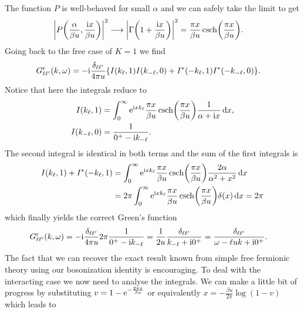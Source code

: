 \documentclass[english, parskip=full]{scrartcl}
\begin{document}
The function $P$ is well-behaved for small $\alpha$ and we can safely take the limit to get
\begin{align}
\abs*{P\kla*{\frac{\alpha}{\beta u}, \frac{\i x}{\beta u}}}^2 &\longrightarrow \abs*{\Gamma\kla*{1 + \frac{\i x}{\beta u}}}^2 = \frac{\pi x}{\beta u} \csch\kla*{\frac{\pi x}{\beta u}}.
\end{align}
Going back to the free case of $K=1$ we find
\begin{align}
G_{\ell\ell'}^\r(k,\omega) &= -\i\frac{\delta_{\ell\ell'}}{4\pi u} \klc*{I\kla*{k_\ell, 1} I(k_{-\ell}, 0) + I^\ast\kla*{-k_\ell, 1} I^\ast(-k_{-\ell}, 0)}.
\end{align}
Notice that here the integrals reduce to
\begin{align}
I(k_\ell, 1) &= \intx{0}{\infty}{\powe{ \i x k_\ell} \frac{\pi x}{\beta u} \csch\kla*{\frac{\pi x}{\beta u}} \frac{1}{\alpha + \i x} }{x},\\
I(k_{-\ell}, 0) &= \frac{1}{0^+ - \i k_{-\ell}}.
\end{align}
The second integral is identical in both terms and the sum of the first integrals is
\begin{align}
I(k_\ell, 1) + I^\ast(-k_\ell,1) &= \intx{0}{\infty}{\powe{\i xk_\ell} \frac{\pi x}{\beta u} \csch\kla*{\frac{\pi x}{\beta u}} \frac{2\alpha}{\alpha^2 + x^2}}{x} \\
&= 2\pi \intx{0}{\infty}{\powe{\i xk_\ell} \frac{\pi x}{\beta u} \csch\kla*{\frac{\pi x}{\beta u}} \delta(x)}{x} = 2\pi
\end{align}
which finally yields the correct Green's function
\begin{align}
G_{\ell\ell'}^{\text{r}} (k,\omega) &= -\text{i} \frac{\delta_{\ell\ell'}}{4\pi u} 2\pi \frac{1}{0^+ - \text{i} k_{-\ell}} = \frac{1}{2u} \frac{\delta_{\ell\ell'}}{k_{-\ell} + \text{i} 0^+} = \frac{\delta_{\ell\ell'}}{\omega - \ell uk + \text{i} 0^+}.
\end{align}
The fact that we can recover the exact result known from simple free fermionic theory using our bosonization identity is encouraging.
To deal with the interacting case we now need to analyse the integrals.
We can make a little bit of progress by substituting $v = 1 - \text{e}^{-\frac{2\pi x}{\beta u}}$ or equivalently $x = -\frac{\beta u}{2\pi} \log(1 - v)$ which leads to
\end{document}
